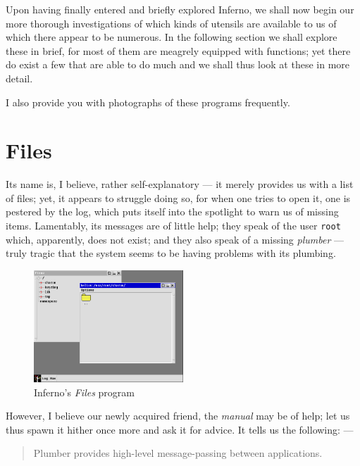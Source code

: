 \documentclass[a5paper,twoside,12pt]{report}
\begin{document}
  Upon having finally entered and briefly explored Inferno, we shall now begin our more thorough investigations of which kinds of utensils are available to us of which there appear to be numerous. In the following section we shall explore these in brief, for most of them are meagrely equipped with functions; yet there do exist a few that are able to do much and we shall thus look at these in more detail.

  I also provide you with photographs of these programs frequently.

  \section*{Files}

  Its name is, I believe, rather self-explanatory — it merely provides us with a list of files; yet, it appears to struggle doing so, for when one tries to open it, one is pestered by the log, which puts itself into the spotlight to warn us of missing items. Lamentably, its messages are of little help; they speak of the user \texttt{root} which, apparently, does not exist; and they also speak of a missing \textit{plumber} — truly tragic that the system seems to be having problems with its plumbing.

  \begin{figure}
    \centering
    \includegraphics[width=0.5\textwidth]{imgs/files.png}
    \caption{Inferno's \textit{Files} program}
  \end{figure}

  However, I believe our newly acquired friend, the \textit{manual} may be of help; let us thus spawn it hither once more and ask it for advice. It tells us the following: —

  \begin{quote}
    Plumber provides high-level message-passing between applications.
  \end{quote}
\end{document}
